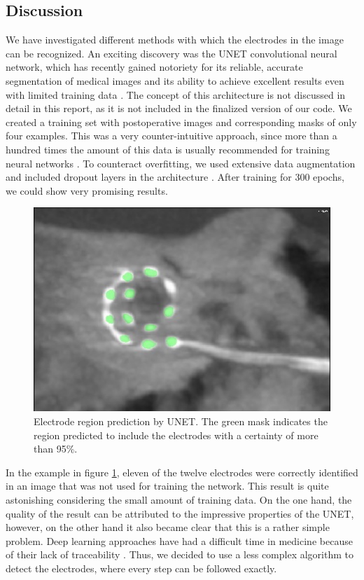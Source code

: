 \documentclass[a4paper, 11pt]{article}
\begin{document}
\begin{enumerate}
\section{Discussion}
We have investigated different methods with which the electrodes in the image can be recognized. An exciting discovery was the UNET convolutional neural network, which has recently gained notoriety for its reliable, accurate segmentation of medical images and its ability to achieve excellent results even with limited training data \cite{ronneberger_u-net_2015}. The concept of this architecture is not discussed in detail in this report, as it is not included in the finalized version of our code. We created a training set with postoperative images and corresponding masks of only four examples. This was a very counter-intuitive approach, since more than a hundred times the amount of this data is usually recommended for training neural networks \cite{hestness_deep_2017,foody_effect_1995}. To counteract overfitting, we used extensive data augmentation and included dropout layers in the architecture \cite{wu_towards_2015}. After training for 300 epochs, we could show very promising results.



\begin{figure}[ht]
	\centering
  \includegraphics[width=.5\textwidth]{UNET.jpg}
	\caption{Electrode region prediction by UNET. The green mask indicates the region predicted to include the electrodes with a certainty of more than 95\%.}
	\label{UNET}
\end{figure}

In the example in figure \ref{UNET}, eleven of the twelve electrodes were correctly identified in an image that was not used for training the network. This result is quite astonishing considering the small amount of training data. On the one hand, the quality of the result can be attributed to the impressive properties of the UNET, however, on the other hand it also became clear that this is a rather simple problem. Deep learning approaches have had a difficult time in medicine because of their lack of traceability \cite{litjens_survey_2017}. Thus, we decided to use a less complex algorithm to detect the electrodes, where every step can be followed exactly. 



\end{enumerate}
\end{document}

